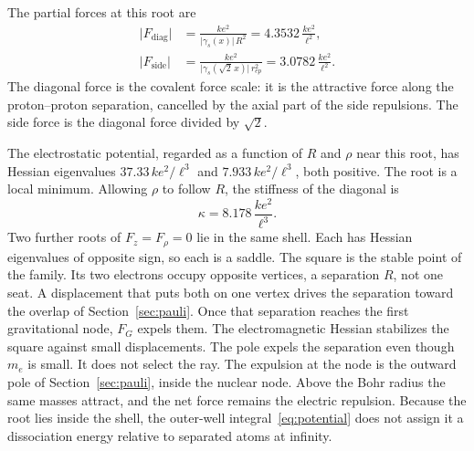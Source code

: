 \documentclass[a4paper]{article}
\begin{document}
The partial forces at this root are
\begin{align}
\bigl|F_{\mathrm{diag}}\bigr|
  &=\frac{k e^{2}}{\bigl|\gamma_s(x)\bigr|\,R^{2}}
  =4.3532\,\frac{k e^{2}}{\ell^{2}},
\label{eq:Fdiag}\\
\bigl|F_{\mathrm{side}}\bigr|
  &=\frac{k e^{2}}{\bigl|\gamma_s(\sqrt{2}\,x)\bigr|\,r_{ep}^{2}}
  =3.0782\,\frac{k e^{2}}{\ell^{2}}.
\label{eq:Fside}
\end{align}
The diagonal force is the covalent force scale: it is the attractive force along the proton--proton separation, cancelled by the axial part of the side repulsions. The side force is the diagonal force divided by \(\sqrt{2}\).

The electrostatic potential, regarded as a function of \(R\) and \(\rho\) near this root, has Hessian eigenvalues \(37.33\,k e^{2}/\ell^{3}\) and \(7.933\,k e^{2}/\ell^{3}\), both positive. The root is a local minimum. Allowing \(\rho\) to follow \(R\), the stiffness of the diagonal is
\begin{equation}
\label{eq:kappa}
\kappa=8.178\,\frac{k e^{2}}{\ell^{3}}.
\end{equation}
Two further roots of \(F_z=F_{\rho}=0\) lie in the same shell. Each has Hessian eigenvalues of opposite sign, so each is a saddle. The square is the stable point of the family. Its two electrons occupy opposite vertices, a separation \(R\), not one seat. A displacement that puts both on one vertex drives the separation toward the overlap of Section~\ref{sec:pauli}. Once that separation reaches the first gravitational node, \(F_G\) expels them. The electromagnetic Hessian stabilizes the square against small displacements. The pole expels the separation even though \(m_e\) is small. It does not select the ray. The expulsion at the node is the outward pole of Section~\ref{sec:pauli}, inside the nuclear node. Above the Bohr radius the same masses attract, and the net force remains the electric repulsion. Because the root lies inside the shell, the outer-well integral~\eqref{eq:potential} does not assign it a dissociation energy relative to separated atoms at infinity.
\end{document}
